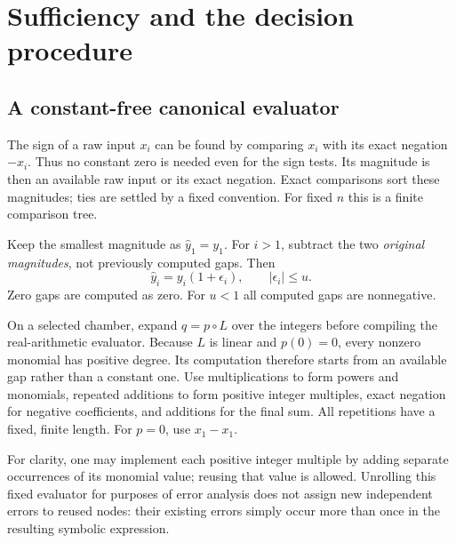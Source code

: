 \documentclass[11pt,a4paper]{article}
\theoremstyle{definition}
\theoremstyle{remark}
\newcommand{\abs}[1]{\lvert #1\rvert}
\begin{document}
\section{Sufficiency and the decision procedure}

\subsection{A constant-free canonical evaluator}

The sign of a raw input $x_i$ can be found by comparing $x_i$ with its exact
negation $-x_i$. Thus no constant zero is needed even for the sign tests.
Its magnitude is then an available raw input or its exact negation. Exact
comparisons sort these magnitudes; ties are settled by a fixed convention.
For fixed $n$ this is a finite comparison tree.

Keep the smallest magnitude as $\widehat y_1=y_1$. For $i>1$, subtract the two
\emph{original magnitudes}, not previously computed gaps. Then
\begin{equation}\label{eq:roundedgaps}
 \widehat y_i=y_i(1+\epsilon_i),\qquad \abs{\epsilon_i}\le u.
\end{equation}
Zero gaps are computed as zero. For $u<1$ all computed gaps are nonnegative.

On a selected chamber, expand $q=p\circ L$ over the integers before compiling
the real-arithmetic evaluator. Because $L$ is linear and $p(0)=0$, every nonzero
monomial has positive degree. Its computation therefore starts from an
available gap rather than a constant one. Use multiplications to form powers
and monomials, repeated additions to form positive integer multiples, exact
negation for negative coefficients, and additions for the final sum. All
repetitions have a fixed, finite length. For $p=0$, use $x_1-x_1$.

For clarity, one may implement each positive integer multiple by adding
separate occurrences of its monomial value; reusing that value is allowed.
Unrolling this fixed evaluator for purposes of error analysis does not assign
new independent errors to reused nodes: their existing errors simply occur
more than once in the resulting symbolic expression.
\end{document}
